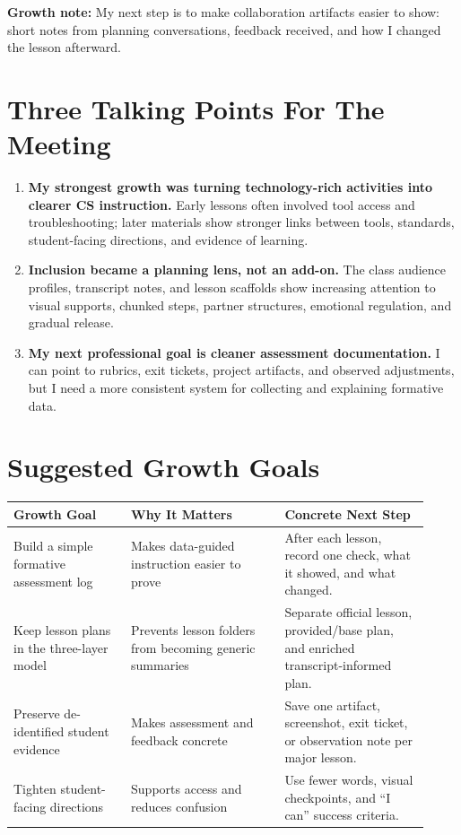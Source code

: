 \documentclass[10pt]{article}
\begin{document}
\textbf{Growth note:} My next step is to make collaboration artifacts easier to show: short notes from planning conversations, feedback received, and how I changed the lesson afterward.

\section{Three Talking Points For The Meeting}

\begin{enumerate}[leftmargin=*]
  \item \textbf{My strongest growth was turning technology-rich activities into clearer CS instruction.} Early lessons often involved tool access and troubleshooting; later materials show stronger links between tools, standards, student-facing directions, and evidence of learning.
  \item \textbf{Inclusion became a planning lens, not an add-on.} The class audience profiles, transcript notes, and lesson scaffolds show increasing attention to visual supports, chunked steps, partner structures, emotional regulation, and gradual release.
  \item \textbf{My next professional goal is cleaner assessment documentation.} I can point to rubrics, exit tickets, project artifacts, and observed adjustments, but I need a more consistent system for collecting and explaining formative data.
\end{enumerate}

\section{Suggested Growth Goals}

\begin{longtable}{>{\raggedright\arraybackslash}p{0.26\linewidth} >{\raggedright\arraybackslash}p{0.34\linewidth} >{\raggedright\arraybackslash}p{0.32\linewidth}}
\textbf{Growth Goal} & \textbf{Why It Matters} & \textbf{Concrete Next Step} \\
\hline
Build a simple formative assessment log & Makes data-guided instruction easier to prove & After each lesson, record one check, what it showed, and what changed. \\
Keep lesson plans in the three-layer model & Prevents lesson folders from becoming generic summaries & Separate official lesson, provided/base plan, and enriched transcript-informed plan. \\
Preserve de-identified student evidence & Makes assessment and feedback concrete & Save one artifact, screenshot, exit ticket, or observation note per major lesson. \\
Tighten student-facing directions & Supports access and reduces confusion & Use fewer words, visual checkpoints, and ``I can'' success criteria. \\
\end{longtable}
\end{document}
